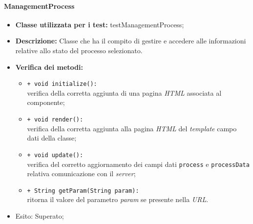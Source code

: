 \paragraph{ManagementProcess}
\begin{flushleft}
\begin{itemize}
\item \textbf{Classe utilizzata per i test:} testManagementProcess;
\item \textbf{Descrizione:} Classe che ha il compito di gestire e accedere alle informazioni relative allo stato del processo selezionato.
\item \textbf{Verifica dei metodi:}
\begin{sloppypar}
\begin{itemize}
\item \texttt{+ void initialize():}\\ verifica della corretta aggiunta di una pagina \textit{HTML} associata al componente;
\item \texttt{+ void render():}\\ verifica della corretta aggiunta alla pagina \textit{HTML} del \textit{template} campo dati della classe;
\item \texttt{+ void update():}\\ verifica del corretto aggiornamento dei campi dati \texttt{process} e \texttt{processData} relativa comunicazione con il \textit{server};
\item \texttt{+ String getParam(String param):}\\ ritorna il valore del parametro \textit{param} se presente nella \textit{URL}.
\end{itemize}
\end{sloppypar}
\item Esito: Superato;
\end{itemize}
\end{flushleft}

